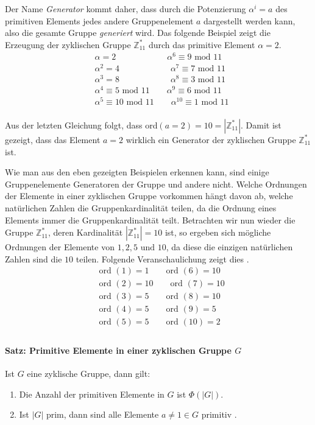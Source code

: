 Der Name \textit{Generator} kommt daher, dass durch die Potenzierung $\alpha^i = a$ des primitiven Elements jedes andere Gruppenelement $a$ dargestellt werden kann, also die gesamte Gruppe \textit{generiert} wird. Das folgende Beispiel zeigt die Erzeugung der zyklischen Gruppe $\mathbb{Z}^*_{11}$ durch das primitive Element $\alpha = 2$.
\begin{align*}
&\alpha = 2 \qquad \qquad \qquad \alpha^6 \equiv 9 \text{ mod } 11\\
&\alpha^2 = 4 \qquad \qquad \qquad \alpha^7 \equiv 7 \text{ mod } 11\\
&\alpha^3 = 8 \qquad \qquad \qquad \alpha^8 \equiv 3 \text{ mod } 11\\
&\alpha^4 \equiv 5 \text{ mod } 11 \qquad \alpha^9 \equiv 6 \text{ mod } 11\\
&\alpha^5 \equiv 10 \text{ mod } 11 \qquad \alpha^{10} \equiv 1 \text{ mod } 11\\
\end{align*}

Aus der letzten Gleichung folgt, dass ord$(a=2)=10=|\mathbb{Z}^*_{11}|$. Damit ist gezeigt, dass das Element $a = 2$ wirklich ein Generator der zyklischen Gruppe $\mathbb{Z}^*_{11}$ ist.

Wie man aus den eben gezeigten Beispielen erkennen kann, sind einige Gruppenelemente Generatoren der Gruppe und andere nicht. Welche Ordnungen der Elemente in einer zyklischen Gruppe vorkommen hängt davon ab, welche natürlichen Zahlen die Gruppenkardinalität teilen, da die Ordnung eines Elements immer die Gruppenkardinalität teilt. Betrachten wir nun wieder die Gruppe $\mathbb{Z}^*_{11}$, deren Kardinalität $|\mathbb{Z}^*_{11}| = 10$ ist, so ergeben sich mögliche Ordnungen der Elemente von $1,2,5 \text{ und }10$, da diese die einzigen natürlichen Zahlen sind die $10$ teilen. Folgende Veranschaulichung zeigt dies \cite[S. 243, 244]{Paar.2016}.
\begin{align*}
&\text{ord }(1) = 1 \qquad \text{ord }(6) = 10\\
&\text{ord }(2) = 10 \qquad \text{ord }(7) = 10\\
&\text{ord }(3) = 5 \qquad \text{ord }(8) = 10\\
&\text{ord }(4) = 5 \qquad \text{ord }(9) = 5\\
&\text{ord }(5) = 5 \qquad \text{ord }(10) = 2\\
\end{align*}

\paragraph{Satz: Primitive Elemente in einer zyklischen Gruppe $G$}
Ist $G$ eine zyklische Gruppe, dann gilt:
\begin{enumerate}
\item Die Anzahl der primitiven Elemente in $G$ ist $\Phi (|G|)$.
\item Ist $|G|$ prim, dann sind alle Elemente $a \neq 1 \in G$ primitiv \cite[S. 244]{Paar.2016}.
\end{enumerate}

